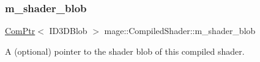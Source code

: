 \subsubsection{\texorpdfstring{m\+\_\+shader\+\_\+blob}{m\_shader\_blob}}
{\footnotesize\ttfamily \hyperlink{namespacemage_ae74f374780900893caa5555d1031fd79}{Com\+Ptr}$<$ I\+D3\+D\+Blob $>$ mage\+::\+Compiled\+Shader\+::m\+\_\+shader\+\_\+blob\hspace{0.3cm}{\ttfamily [private]}}

A (optional) pointer to the shader blob of this compiled shader. 